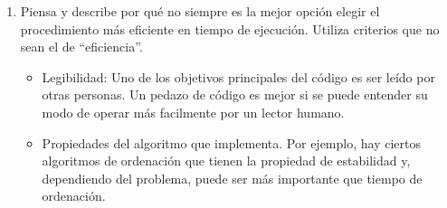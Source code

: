 \documentclass[12pt]{article}
\begin{document}
\begin{enumerate}
				De acuerdo a la funci\'on time, el procedimiento 'gcd-generative siempre es m\'as r\'apido, sin importar el tama\~no de las entradas. 
				Prob\'e entradas de dos digitos y la funci\'on a\'un no hac\'ia una medici\'on suficientemente precisa. Luego en los decenas de miles y 
				'gcd-generative fue m\'as r\'apido. Luego en las decenas de cientos de millones y 'gcd-generative termin\'o mientras que el estructural
				estaba tardando m\'as de lo que estaba dispuesto a esperar.\\

				Tambi\'en, se puede ver que 'gcd-structural tiene complejidad lineal en tiempo respecto a (min n m) y la de 'gcd-generative es logaritmica
				en tiempo respecto a (min n m).\\

		\item{Piensa y describe por qué no siempre es la mejor opción elegir el procedimiento más eficiente en tiempo de ejecución. Utiliza criterios que no 
				sean el de “eficiencia”.}\\

				\begin{itemize}
						\item{Legibilidad: Uno de los objetivos principales del c\'odigo es ser le\'ido por otras personas. Un pedazo de c\'odigo es mejor si
								se puede entender su modo de operar m\'as facilmente por un lector humano.}\\
						\item{Propiedades del algoritmo que implementa. Por ejemplo, hay ciertos algoritmos de ordenaci\'on que tienen la propiedad de estabilidad
								y, dependiendo del problema, puede ser m\'as importante que tiempo de ordenaci\'on.}\\
				\end{itemize}
				
\end{enumerate}
\end{document}

